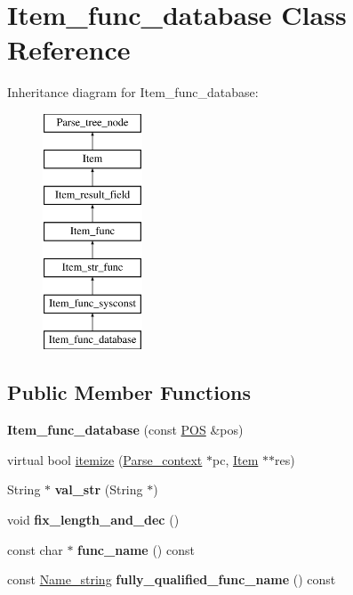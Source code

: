 \hypertarget{classItem__func__database}{}\section{Item\+\_\+func\+\_\+database Class Reference}
\label{classItem__func__database}
Inheritance diagram for Item\+\_\+func\+\_\+database\+:\begin{figure}[H]
\begin{center}
\leavevmode
\includegraphics[height=7.000000cm]{classItem__func__database}
\end{center}
\end{figure}
\subsection*{Public Member Functions}
\begin{DoxyCompactItemize}
\item 
\mbox{\label{classItem__func__database_acb1a4790b2d13cb55e8eed5423ada9aa}} 
{\bfseries Item\+\_\+func\+\_\+database} (const \mbox{\hyperlink{structYYLTYPE}{P\+OS}} \&pos)
\item 
virtual bool \mbox{\hyperlink{classItem__func__database_a7faef292296f73f2a62f71faeb4a7d5c}{itemize}} (\mbox{\hyperlink{structParse__context}{Parse\+\_\+context}} $\ast$pc, \mbox{\hyperlink{classItem}{Item}} $\ast$$\ast$res)
\item 
\mbox{\label{classItem__func__database_a773d969c0a775a8d481f99c87f8088cd}} 
String $\ast$ {\bfseries val\+\_\+str} (String $\ast$)
\item 
\mbox{\label{classItem__func__database_a1ce169ddb84049f088fde1a4fc961f5b}} 
void {\bfseries fix\+\_\+length\+\_\+and\+\_\+dec} ()
\item 
\mbox{\label{classItem__func__database_ac86d6476efd6125b2102e14a61456014}} 
const char $\ast$ {\bfseries func\+\_\+name} () const
\item 
\mbox{\label{classItem__func__database_ab063363d4c2cb0e33d81167156e35217}} 
const \mbox{\hyperlink{className__string}{Name\+\_\+string}} {\bfseries fully\+\_\+qualified\+\_\+func\+\_\+name} () const
\end{DoxyCompactItemize}
